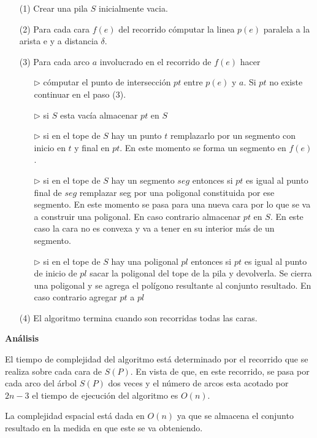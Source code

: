 \documentclass[12pt,english]{report}
\begin{document}
\begin{itemize}
	\item [(1)]Crear una pila $S$ inicialmente vacia.
	\item [(2)]Para cada cara $f(e)$ del recorrido c\'omputar la linea $p(e)$ paralela a la arista e y a distancia $\delta$.
	\item [(3)]Para cada arco $a$ involucrado en el recorrido de $f(e)$ hacer
	\begin{itemize}
	\item [$\triangleright$]c\'omputar el punto de intersecci\'on $pt$ entre $p(e)$ y $a$. Si $pt$ no existe continuar en el paso (3). 
	\item [$\triangleright$]si $S$ esta vac\'ia almacenar $pt$ en $S$
	\item[$\triangleright$]si en el tope de $S$ hay un punto $t$ remplazarlo por un segmento con inicio en $t$ y final en $pt$. En este momento se forma un segmento en $f(e)$.
	\item[$\triangleright$]si en el tope de $S$ hay un segmento $seg$ entonces si $pt$ es igual al punto final de $seg$ remplazar seg por una poligonal constituida por ese segmento. En este momento se pasa para una nueva cara por lo que se va a construir una poligonal. En caso contrario almacenar $pt$ en $S$. En este caso la cara no es convexa y va a tener en su interior m\'as de un segmento.
	  \item[$\triangleright$]si en el tope de $S$ hay una poligonal $pl$ entonces si $pt$ es igual al punto de inicio de $pl$ sacar la poligonal del tope de la pila y devolverla. Se cierra una poligonal y se agrega el pol\'igono resultante al conjunto resultado. En caso contrario agregar $pt$ a $pl$
\end{itemize}
\item[(4)]El algoritmo termina cuando son recorridas todas las caras. 
	
\end{itemize}

\begin{flushleft}
\bfseries {\normalsize{An\'alisis}}
\end{flushleft}

El tiempo de complejidad del algoritmo est\'a determinado por el recorrido que se realiza sobre cada cara de $S(P)$. En vista de que, en este recorrido, se pasa por cada arco del \'arbol $S(P)$ dos veces y el n\'umero de arcos esta acotado por $2n - 3$ el tiempo de ejecuci\'on del algoritmo es $O(n)$.

La complejidad espacial est\'a dada en $O(n)$ ya que se almacena el conjunto resultado en la medida en que este se va obteniendo.   
\end{document}
